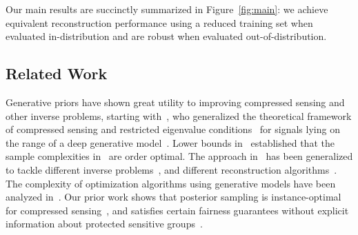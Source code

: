 \documentclass{article}
\begin{document}
Our main results are succinctly summarized in Figure~\ref{fig:main}:
we achieve equivalent reconstruction performance using a reduced
training set when evaluated in-distribution and are robust when
evaluated out-of-distribution.

\subsection{Related Work} 

Generative priors have shown great utility to improving compressed
sensing and other inverse problems, starting
with~\cite{bora2017compressed}, who generalized the theoretical
framework of compressed sensing and restricted eigenvalue
conditions~\cite{tibshirani1996regression,
donoho2006compressed,bickel2009simultaneous, candes2008restricted,
hegde2008random, baraniuk2009random, baraniuk2010model,
eldar2009robust} for signals lying on the range of a deep generative
model~\cite{goodfellow2014generative, kingma2013auto,
song2021scorebased}.  Lower bounds in~\cite{kamath2019lower,
liu2019information, jalali2019solving} established that the sample
complexities in~\cite{bora2017compressed} are order optimal.  The
approach in~\cite{bora2017compressed} has been generalized to tackle
different inverse problems~\cite{jalal2020robust, hand2018phase,
    asim2018solving, qiu2019robust, liu2020sample, mardani2017deep,
    rick2017one, balevi2020high}, and different reconstruction
    algorithms~\cite{dhar2018modeling, kabkab2018task,
    pandit2019inference, fletcher2018inference, fletcher2018plug,
mardani2018deep, heckel2018deep, heckel2020compressive,
daras2021intermediate}.  The complexity of optimization algorithms
using generative models have been analyzed in~\cite{gomez2019fast,
hegde2018algorithmic, lei2019inverting, hand2017global}.  Our prior
work shows that posterior sampling is instance-optimal for compressed
sensing~\cite{jalal2021instance}, and satisfies certain fairness
guarantees without explicit information about protected sensitive
groups~\cite{jalal2021fairness}.
\end{document}
